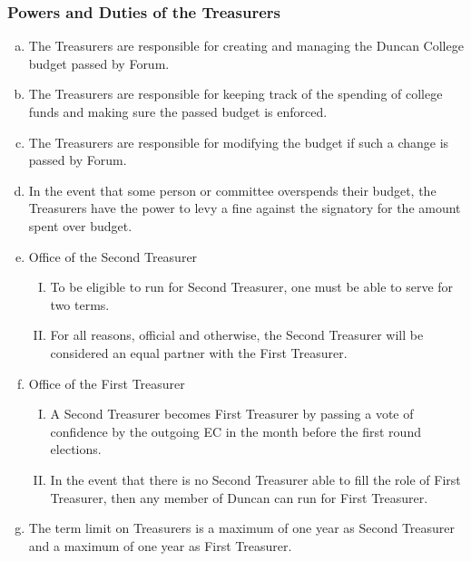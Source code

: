 \documentclass[USletter,12pt]{article}
\begin{document}
\begin{enumerate}[(a)]
\subsubsection{Powers and Duties of the Treasurers}
\begin{enumerate}[(a)]
\item The Treasurers are responsible for creating and managing the Duncan College budget passed by Forum.
\item The Treasurers are responsible for keeping track of the spending of college funds and making sure the passed budget is enforced.
\item The Treasurers are responsible for modifying the budget if such a change is passed by Forum.
\item In the event that some person or committee overspends their budget, the Treasurers have the power to levy a fine against the signatory for the amount spent over budget.  
\item Office of the Second Treasurer
	\begin{enumerate}[(I)]
	\item To be eligible to run for Second Treasurer, one must be able to serve for two terms.
	\item For all reasons, official and otherwise, the Second Treasurer will be considered an equal partner with the First Treasurer.
	\end{enumerate}
\item Office of the First Treasurer
	\begin{enumerate}[(I)]
	\item A Second Treasurer becomes First Treasurer by passing a vote of confidence by the outgoing EC in the month before the first round elections.
	\item In the event that there is no Second Treasurer able to fill the role of First Treasurer, then any member of Duncan can run for First Treasurer.
	\end{enumerate}
\item The term limit on Treasurers is a maximum of one year as Second Treasurer and a maximum of one year as First Treasurer. 
\end{enumerate}


\end{enumerate}
\end{document}
